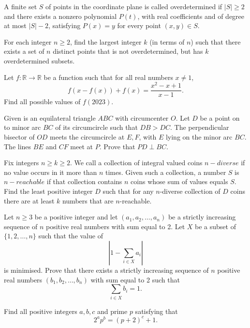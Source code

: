 \documentclass[11pt]{scrartcl}
\begin{document}
\begin{problem}[244533208775214844]
A finite set $S$ of points in the coordinate plane is called overdetermined if $|S|\ge 2$ and there exists a nonzero polynomial $P(t)$, with real coefficients and of degree at most $|S|-2$, satisfying $P(x)=y$ for every point $(x,y)\in S$.

For each integer $n\ge 2$, find the largest integer $k$ (in terms of $n$) such that there exists a set of $n$ distinct points that is not overdetermined, but has $k$ overdetermined subsets.
\end{problem}
\begin{problem}[249336393279214231]
Let \(f:\mathbb R\to\mathbb R\) be a function such that for all real numbers \(x\neq1\),\[f(x-f(x))+f(x)=\frac{x^2-x+1}{x-1}.\]Find all possible values of \(f(2023)\).
\end{problem}
\begin{problem}[255403454348745096]
	Given is an equilateral triangle $ABC$ with circumcenter $O$. Let $D$ be a point on to minor arc $BC$ of its circumcircle such that $DB>DC$. The perpendicular bisector of $OD$ meets the circumcircle at $E, F$, with $E$ lying on the minor arc $BC$. The lines $BE$ and $CF$ meet at $P$. Prove that $PD \perp BC$.
\end{problem}
\begin{problem}[267446035349026955]
	Fix integers $n\ge k\ge 2$. We call a collection of integral valued coins $n-diverse$ if no value occurs in it more than $n$ times. Given such a collection, a number $S$ is $n-reachable$ if that collection contains $n$ coins whose sum of values equals $S$. Find the least positive integer $D$ such that for any $n$-diverse collection of $D$ coins there are at least $k$ numbers that are $n$-reachable.
\end{problem}
\begin{problem}[290912955085727393]
Let $n \geqslant 3$ be a positive integer and let $\left(a_{1}, a_{2}, \ldots, a_{n}\right)$ be a strictly increasing sequence of $n$ positive real numbers with sum equal to 2. Let $X$ be a subset of $\{1,2, \ldots, n\}$ such that the value of
\[
\left|1-\sum_{i \in X} a_{i}\right|
\]is minimised. Prove that there exists a strictly increasing sequence of $n$ positive real numbers $\left(b_{1}, b_{2}, \ldots, b_{n}\right)$ with sum equal to 2 such that
\[
\sum_{i \in X} b_{i}=1.
\]
\end{problem}
\begin{problem}[291206752155758693]
Find all positive integers $a,b,c$ and prime $p$ satisfying that
\[ 2^a p^b=(p+2)^c+1.\]
\end{problem}
\end{document}
